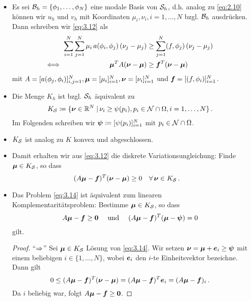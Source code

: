 \begin{itemize}
\item Es sei $\mathcal B_h = \{\phi_1,\ldots,\phi_N\}$ eine modale Basis von $\mathcal S_h$, d.h. analog zu \eqref{eq:2.10} können wir $u_h$ und $v_h$ mit Koordinaten $\mu_i,\nu_i, i = 1,\ldots,N$ bzgl. $\mathcal B_h$ ausdrücken. Dann schreiben wir \eqref{eq:3.12} als
\begin{align*}
	\sum_{i = 1}^N\sum_{j=1}^N \mu_i \, a(\phi_i,\phi_j)\, (\nu_j-\mu_j) & \ge \sum_{j=1}^N  (f,\phi_j) \, (\nu_j-\mu_j)  \\
	\Longleftrightarrow\quad \qquad  \qquad \qquad \boldsymbol \mu^T A (\boldsymbol \nu- \boldsymbol\mu) &  \ge \boldsymbol f^T (\boldsymbol \nu-\boldsymbol \mu)
\end{align*}
mit $A = [a(\phi_j,\phi_i)]_{i,j=1}^N, \boldsymbol \mu = [\mu_i]_{i=1}^N,\boldsymbol \nu = [\nu_i]_{i=1}^N$ und $\boldsymbol f = [(f,\phi_i)]_{i=1}^N$.

\item Die Menge $K_h$ ist bzgl. $\mathcal S_h$ äquivalent zu
\begin{align}\label{eq:3.13}
	K_{\mathcal S} \coloneqq \{\boldsymbol \nu \in \mathbb{R}^N \;\vert\, \nu_i \ge \psi(p_i) , p_i \in \mathcal N \cap \Omega, i = 1,\ldots, N \} \, .
\end{align}
Im Folgenden schreiben wir $\boldsymbol \psi \coloneqq [\psi(p_i)]_{i=1}^N$ mit $p_i \in \mathcal N\cap \Omega$.

\item \begin{bem*}
$K_{\mathcal S}$ ist analog zu $K$ konvex und abgeschlossen.
\end{bem*}

\item Damit erhalten wir aus \eqref{eq:3.12} die diskrete Variationsungleichung: Finde $\boldsymbol\mu \in K_{\mathcal S}$, so dass
\begin{align}\label{eq:3.14}
	(A\boldsymbol \mu-\boldsymbol f)^T (\boldsymbol \nu- \boldsymbol\mu) &  \ge 0 \quad \forall \, \boldsymbol \nu \in K_{\mathcal S} \, .
\end{align}

\item \begin{satz}\label{satz:3.10}
Das Problem \eqref{eq:3.14} ist äquivalent zum linearen Komplementaritätsproblem: Bestimme $\boldsymbol\mu \in K_{\mathcal S}$, so dass
\begin{align}\label{eq:3.15}
	A\boldsymbol\mu - \boldsymbol f \ge \boldsymbol 0\quad\text{ und }\quad (A\boldsymbol\mu-\boldsymbol f)^T(\boldsymbol \mu - \boldsymbol\psi) = 0
\end{align}
gilt.
\end{satz}

\begin{proof}
"`$\Rightarrow$"' Sei $\boldsymbol \mu \in K_{\mathcal S}$ Lösung von \eqref{eq:3.14}. Wir setzen $\boldsymbol\nu = \boldsymbol \mu +\boldsymbol e_i \ge \boldsymbol\psi$ mit einem beliebigen $i \in \{1,\ldots,N\}$, wobei $\boldsymbol e_i $ den $i$-te Einheitsvektor bezeichne. Dann gilt
\[
	0 \le (A\boldsymbol\mu - \boldsymbol f)^T (\boldsymbol\nu - \boldsymbol\mu) = (A\boldsymbol\mu - \boldsymbol f)^T \boldsymbol e_i = (A\boldsymbol \mu-\boldsymbol f)_i \, .
\]
Da $i$ beliebig war, folgt $A\boldsymbol\mu - \boldsymbol f\ge \boldsymbol 0$.


\end{proof}
\end{itemize}
